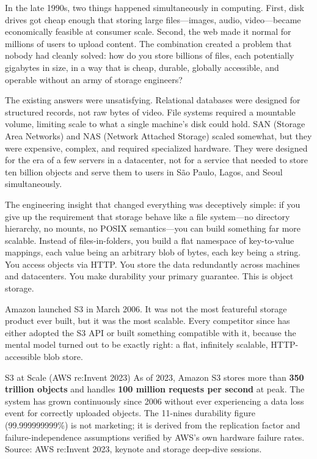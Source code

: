 \documentclass[11pt,a4paper]{article}
\begin{document}
In the late 1990s, two things happened simultaneously in computing. First, disk drives got cheap enough that storing large files---images, audio, video---became economically feasible at consumer scale. Second, the web made it normal for millions of users to upload content. The combination created a problem that nobody had cleanly solved: how do you store billions of files, each potentially gigabytes in size, in a way that is cheap, durable, globally accessible, and operable without an army of storage engineers?

The existing answers were unsatisfying. Relational databases were designed for structured records, not raw bytes of video. File systems required a mountable volume, limiting scale to what a single machine's disk could hold. SAN (Storage Area Networks) and NAS (Network Attached Storage) scaled somewhat, but they were expensive, complex, and required specialized hardware. They were designed for the era of a few servers in a datacenter, not for a service that needed to store ten billion objects and serve them to users in São Paulo, Lagos, and Seoul simultaneously.

The engineering insight that changed everything was deceptively simple: if you give up the requirement that storage behave like a file system---no directory hierarchy, no mounts, no POSIX semantics---you can build something far more scalable. Instead of files-in-folders, you build a flat namespace of key-to-value mappings, each value being an arbitrary blob of bytes, each key being a string. You access objects via HTTP. You store the data redundantly across machines and datacenters. You make durability your primary guarantee. This is object storage.

Amazon launched S3 in March 2006. It was not the most featureful storage product ever built, but it was the most scalable. Every competitor since has either adopted the S3 API or built something compatible with it, because the mental model turned out to be exactly right: a flat, infinitely scalable, HTTP-accessible blob store.

\begin{industrybox}{S3 at Scale (AWS re:Invent 2023)}
As of 2023, Amazon S3 stores more than \textbf{350 trillion objects} and handles \textbf{100 million requests per second} at peak. The system has grown continuously since 2006 without ever experiencing a data loss event for correctly uploaded objects. The 11-nines durability figure (99.999999999\%) is not marketing; it is derived from the replication factor and failure-independence assumptions verified by AWS's own hardware failure rates. Source: AWS re:Invent 2023, keynote and storage deep-dive sessions.
\end{industrybox}
\end{document}
